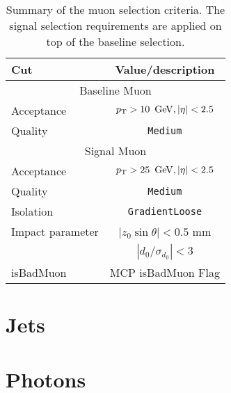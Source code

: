 \begin{table}[ph!]
  \begin{center}\renewcommand\arraystretch{1.2}
    \begin{tabular}{|l|c|}
      \hline
      Cut            & Value/description \\
      \hline
      \hline
      \multicolumn{2}{|c|}{Baseline Muon}\\
      \hline
      Acceptance     & $\pt > 10\,\GeV, |\eta| < 2.5$ \\
      Quality        & \texttt{Medium}    \\
      \hline
      \multicolumn{2}{|c|}{Signal Muon}\\
      \hline
      Acceptance     & $\pt > 25\,\GeV, |\eta| < 2.5$ \\
      Quality        & \texttt{Medium}    \\
      Isolation        & \texttt{GradientLoose} \\
      Impact parameter & $|z_0 \sin\theta|< 0.5$ mm \\
                       & $|d_0/\sigma_{d_0}|< 3$ \\ 
      isBadMuon        & MCP isBadMuon Flag  \\
      \hline		  
    \end{tabular}
  \caption{Summary of the muon selection criteria. The signal selection requirements are applied on top of the baseline selection.}                
    \label{tab:muondef}
  \end{center}
\end{table}

\section{Jets}
\section{Photons}
